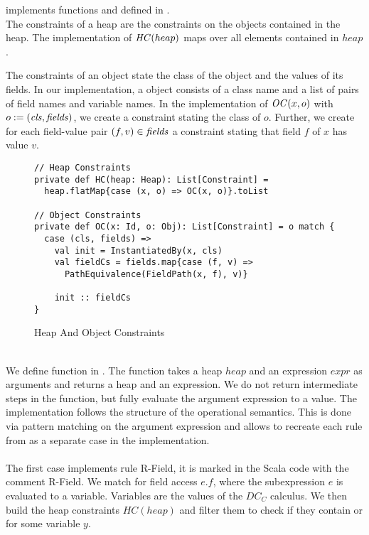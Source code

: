 %
 implements functions  and 
defined in .
\\
The constraints of a heap are the constraints
on the objects contained in the heap.
The implementation of $\mathit{HC}(heap)$ maps  over
all elements contained in $heap$.

The constraints of an object state the class of the object
and the values of its fields.
In our implementation, a object consists of a class name
and a list of pairs of field names and variable names.
In the implementation of $\mathit{OC}(x, o)$ with $o := (\mathit{cls}, \mathit{fields})$,
we create a constraint  stating the class of $o$.
Further, we create for each field-value pair $(f, v) \in \mathit{fields}$
a constraint  stating that field $f$ of $x$ has value $v$.
%
\begin{figure}[h]
\begin{lstlisting}
// Heap Constraints
private def HC(heap: Heap): List[Constraint] =
  heap.flatMap{case (x, o) => OC(x, o)}.toList

// Object Constraints
private def OC(x: Id, o: Obj): List[Constraint] = o match {
  case (cls, fields) =>
    val init = InstantiatedBy(x, cls)
    val fieldCs = fields.map{case (f, v) =>
      PathEquivalence(FieldPath(x, f), v)}

    init :: fieldCs
}
\end{lstlisting}
\caption{Heap And Object Constraints}
\label{fig:scala-heapconstr}
\end{figure}
\\
We define function  in .
The function takes a heap $heap$ and an expression $expr$
as arguments and returns a heap and an expression.
We do not return intermediate steps in the function,
but fully evaluate the argument expression to a value.
The implementation follows the structure of the operational
semantics.
This is done via pattern matching on the argument expression
and allows to recreate each rule from 
as a separate case in the implementation.\\
\\
The first case implements rule R-Field,
it is marked in the Scala code with the comment R-Field.
We match for field access $e.f$, where the subexpression $e$
is evaluated to a variable.
Variables are the values of the $DC_C$ calculus.
We then build the heap constraints $HC(heap)$
and filter them to check if they contain 
or  for some variable $y$.
